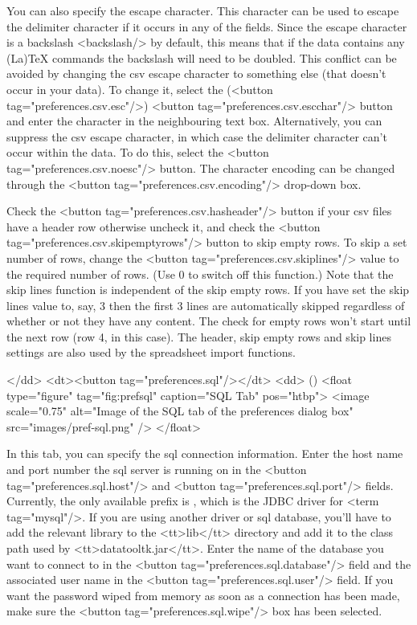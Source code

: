      You can also specify the escape character. This character can be used to 
     escape the delimiter character if it occurs in any of the fields. Since the
     escape character is a backslash <backslash/> by default, this means
     that if the data contains any (La)TeX commands the backslash will need
     to be doubled. This conflict can be avoided by changing the 
     \gls{csv} escape character to something else (that doesn't occur 
     in your data). To change it, select the (<button tag="preferences.csv.esc"/>) 
     <button tag="preferences.csv.escchar"/> button and enter the
     character in the neighbouring text box. Alternatively, you can suppress the \gls{csv}
     escape character, in which case the delimiter character can't occur within 
     the data. To do this, select the <button tag="preferences.csv.noesc"/>
     button.  The character encoding can be changed through the 
     <button tag="preferences.csv.encoding"/> drop-down box.

Check the
     <button tag="preferences.csv.hasheader"/> button if your 
     \gls{csv} files have a header row otherwise uncheck it, and
     check the  <button tag="preferences.csv.skipemptyrows"/> button
     to skip empty rows. To skip a set number of rows, change the
     <button tag="preferences.csv.skiplines"/> value to the required number 
     of rows. (Use 0 to switch off this function.) Note that the skip lines
     function is independent of the skip empty rows. If you have set the 
     skip lines value to, say, 3 then the first 3 lines are automatically 
     skipped regardless of whether or not they have any content. The check for 
     empty rows won't start until the next row (row 4, in this case).
     The header, skip empty rows and skip lines settings are also used by
     the spreadsheet import functions.

    </dd>
    <dt><button tag="preferences.sql"/></dt>
    <dd>
     ()
     <float type="figure" tag="fig:prefsql" caption="SQL Tab" pos="htbp">
      <image scale="0.75" alt="Image of the SQL tab of the preferences dialog box" src="images/pref-sql.png" />
     </float>

    In this tab, you can specify the \gls{sql} connection information.
    Enter the host name and port number the \gls{sql} server is 
    running on in the <button tag="preferences.sql.host"/> and 
    <button tag="preferences.sql.port"/> fields. Currently, the only
    available prefix is , which is the JDBC driver for
    <term tag="mysql"/>. If you are using another driver or \gls{sql} 
    database, you'll have to add the relevant library to the <tt>lib</tt>
    directory and add it to the class path used by <tt>datatooltk.jar</tt>.
    Enter the name of the database you want to connect to in the 
    <button tag="preferences.sql.database"/> field and the associated
    user name in the <button tag="preferences.sql.user"/> field.
    If you want the password wiped from memory as soon as a connection
    has been made, make sure the <button tag="preferences.sql.wipe"/>
    box has been selected.

